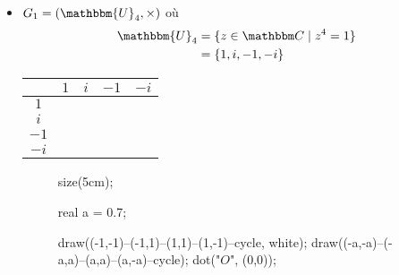 \begin{exm}
	\begin{itemize}
		\item 
			$G_1 = \left( \mathbbm{U}_4, \times \right)$ où
			\begin{align*}
				\mathbbm{U}_4 &= \{z \in \C \mid z^4 = 1\}\\
				&= \{1, i, -1, -i\}  \\
			\end{align*}
			
			\begin{center}
				\begin{tabular}{|c|c|c|c|c|}
					\hline
					\diagbox{$y$}{$x$} & $1$ & $i$ & $-1$ & $-i$\\\hline
					$ 1$ & \color{orange}{$1$} & \color{green}{$i$} & \color{cyan}{$-1$} & \color{magenta}{$-i$}\\\hline
					$ i$ & \color{green}{$i$} & \color{cyan}{$-1$} & \color{magenta}{$-i$} & \color{orange}{$1$}\\\hline
					$ -1$ & \color{cyan}{$-1$} & \color{magenta}{$-i$} & \color{orange}{$1$} & \color{green}{$i$}\\\hline
					$ -i$ & \color{magenta}{$-i$} & \color{orange}{$1$} & \color{green}{$i$} & \color{cyan}{$-1$}\\\hline
				\end{tabular}
			\end{center}

			\begin{figure}[H]
				\center
				\begin{asy}
					size(5cm);

					real a = 0.7;

					draw((-1,-1)--(-1,1)--(1,1)--(1,-1)--cycle, white);
					draw((-a,-a)--(-a,a)--(a,a)--(a,-a)--cycle);
					dot("$O$", (0,0));
				\end{asy}
			\end{figure}


\end{itemize}
\end{exm}

